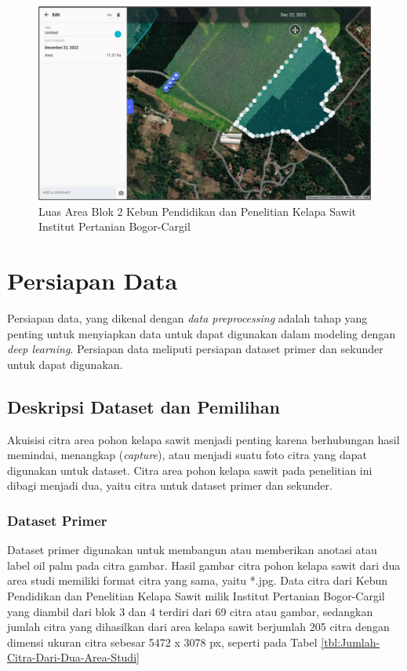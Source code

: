 \begin{figure}[H]
	\vspace{-0.1cm}
	\begin{center}
		\includegraphics[width=0.7\columnwidth]{bab4/Gambar/Picture3.jpg}
	\end{center}
	\vspace{-0.2cm}
	\captionsetup{justification=centering}
	\caption{Luas Area Blok 2 Kebun Pendidikan dan Penelitian Kelapa Sawit Institut Pertanian Bogor-Cargil}\label{img:Luas-Area-Blok-2-Kebun-Pendidikan}
\end{figure}

\section{Persiapan Data}
\hspace{1,2cm}
Persiapan data, yang dikenal dengan \textit{data preprocessing} adalah tahap yang penting untuk menyiapkan data untuk dapat digunakan dalam modeling dengan \textit{deep learning}. Persiapan data meliputi persiapan dataset primer dan sekunder untuk dapat digunakan.

\subsection{Deskripsi Dataset dan Pemilihan}
\hspace{1,2cm}
Akuisisi citra area pohon kelapa sawit menjadi penting karena berhubungan hasil memindai, menangkap (\textit{capture}), atau menjadi suatu foto citra yang dapat digunakan untuk dataset. Citra area pohon kelapa sawit pada penelitian ini dibagi menjadi dua, yaitu citra untuk dataset primer dan sekunder.

\subsubsection{Dataset Primer}
\hspace{1,2cm}
Dataset primer digunakan untuk membangun atau memberikan anotasi atau label oil palm pada citra gambar. Hasil gambar citra pohon kelapa sawit dari dua area studi memiliki format citra yang sama, yaitu *.jpg. Data citra dari Kebun Pendidikan dan Penelitian Kelapa Sawit milik Institut Pertanian Bogor-Cargil yang diambil dari blok 3 dan 4 terdiri dari 69 citra atau gambar, sedangkan jumlah citra yang dihasilkan dari area kelapa sawit berjumlah 205 citra dengan dimensi ukuran citra sebesar 5472 x 3078 px, seperti pada Tabel \ref{tbl:Jumlah-Citra-Dari-Dua-Area-Studi}

